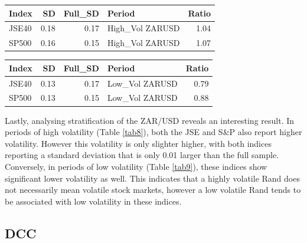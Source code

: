 \documentclass[11pt,preprint, authoryear]{elsarticle}
\let\origtable\table
\let\endorigtable\endtable
\renewenvironment{table}[1][2] {
    \expandafter\origtable\expandafter[H]
} {
    \endorigtable
}
\numberwithin{equation}{section}
\numberwithin{figure}{section}
\numberwithin{table}{section}
\begin{document}
\begin{table}[H]
\centering
\caption{ZAR/USD High Volatility \label{tab8}} 
\begin{tabular}{lrrlr}
  \hline
Index & SD & Full\_SD & Period & Ratio \\ 
  \hline
JSE40 & 0.18 & 0.17 & High\_Vol ZARUSD & 1.04 \\ 
  SP500 & 0.16 & 0.15 & High\_Vol ZARUSD & 1.07 \\ 
   \hline
\end{tabular}
\end{table}
\begin{table}[H]
\centering
\caption{ZAR/USD Low Volatility \label{tab9}} 
\begin{tabular}{lrrlr}
  \hline
Index & SD & Full\_SD & Period & Ratio \\ 
  \hline
JSE40 & 0.13 & 0.17 & Low\_Vol ZARUSD & 0.79 \\ 
  SP500 & 0.13 & 0.15 & Low\_Vol ZARUSD & 0.88 \\ 
   \hline
\end{tabular}
\end{table}

Lastly, analysing stratification of the ZAR/USD reveals an interesting
result. In periods of high volatility (Table \ref{tab8}), both the JSE
and S\&P also report higher volatility. However this volatility is only
slighter higher, with both indices reporting a standard deviation that
is only 0.01 larger than the full sample. Conversely, in periods of low
volatility (Table \ref{tab9}), these indices show significant lower
volatility as well. This indicates that a highly volatile Rand does not
necessarily mean volatile stock markets, however a low volatile Rand
tends to be associated with low volatility in these indices.

\hypertarget{dcc}{%
\subsection{DCC}\label{dcc}}
\end{document}
